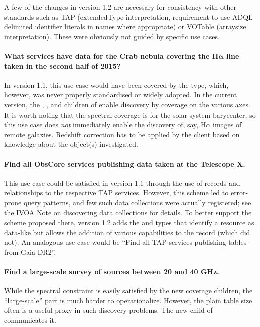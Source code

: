 \documentclass[11pt,a4paper]{ivoa}
\begin{document}
A few of the changes in version 1.2 are necessary for consistency with other standards
such as TAP (extendedType interpretation, requirement to use ADQL
delimited identifier literals in names where appropriate) or VOTable
(arraysize interpretation).  These were obviously not guided by specific
use cases.


\paragraph{What services have data for the Crab nebula covering the
H$\boldsymbol\alpha$ 
line taken in the second half of 2015?}  In version 1.1, this use case
would have been covered by the  type,
which, however, was never properly standardised or widely adopted.  In the current
version, the , , and 
children of  enable discovery by coverage on the various
axes.  It is worth noting that the spectral coverage is for the solar
system barycenter, so this use case does \emph{not} immediately enable
the discovery of, say, H$\alpha$ images of remote galaxies.  Redshift
correction has to be applied by the client based on knowledge about the
object(s) investigated.

\paragraph{Find all ObsCore services publishing data taken at the
Telescope X.} This use case could be satisfied in version 1.1 through
the use of  records and relationships to the
respective TAP services.  However, this scheme led to error-prone query
patterns, and few such data collections were actually registered; see
the IVOA Note on discovering data collections \citep{2019ivoa.rept.0520D} for
details.  To better support the scheme proposed there, version 1.2 adds
the  and  types 
that identify a resource as data-like but
allows the addition of various capabilities to the record (which
 did not).  An analogous use case would be
``Find all TAP services publishing tables from Gaia DR2''.

\paragraph{Find a large-scale survey of sources between 20 and 40 GHz.}
While the spectral constraint is easily satisfied by the new coverage
children, the ``large-scale'' part is much harder to operationalize.
However, the plain table size often is a useful proxy in such discovery
problems.  The new  child of  communicates
it.
\end{document}
